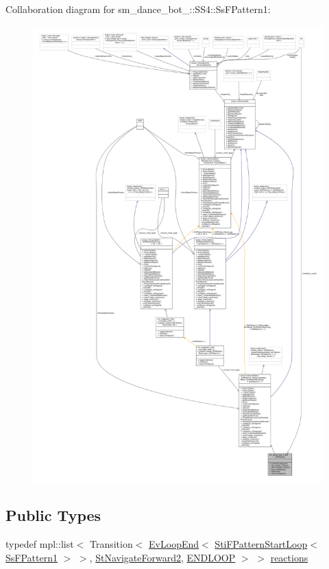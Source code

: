 Collaboration diagram for sm\+\_\+dance\+\_\+bot\+\_\+:\+:S\+S4\+:\+:Ss\+F\+Pattern1\+:
\nopagebreak
\begin{figure}[H]
\begin{center}
\leavevmode
\includegraphics[width=350pt]{structsm__dance__bot__2_1_1SS4_1_1SsFPattern1__coll__graph}
\end{center}
\end{figure}
\subsection*{Public Types}
\begin{DoxyCompactItemize}
\item 
typedef mpl\+::list$<$ Transition$<$ \hyperlink{structsmacc_1_1default__events_1_1EvLoopEnd}{Ev\+Loop\+End}$<$ \hyperlink{classsm__dance__bot__2_1_1f__pattern__states_1_1StiFPatternStartLoop}{Sti\+F\+Pattern\+Start\+Loop}$<$ \hyperlink{structsm__dance__bot__2_1_1SS4_1_1SsFPattern1}{Ss\+F\+Pattern1} $>$ $>$, \hyperlink{structsm__dance__bot__2_1_1StNavigateForward2}{St\+Navigate\+Forward2}, \hyperlink{structsmacc_1_1default__transition__tags_1_1ENDLOOP}{E\+N\+D\+L\+O\+OP} $>$ $>$ \hyperlink{structsm__dance__bot__2_1_1SS4_1_1SsFPattern1_a77816d0a62d0a0a0183249c48e1ae756}{reactions}
\end{DoxyCompactItemize}
